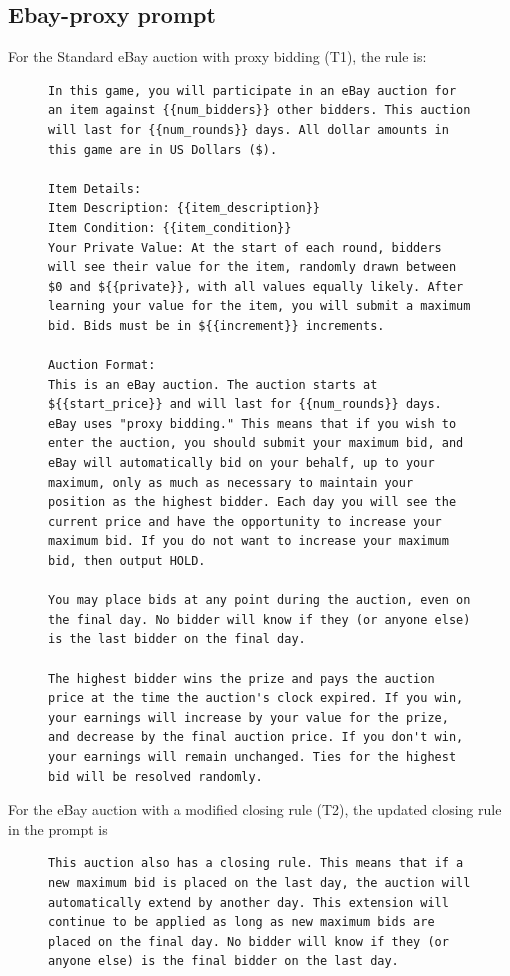 \documentclass{article} %
\begin{document}
\subsection{Ebay-proxy prompt}
For the Standard eBay auction with proxy bidding (T1), the rule is:
\begin{figure}[H]
\centering
\begin{minipage}{0.95\textwidth}
\begin{lstlisting}
In this game, you will participate in an eBay auction for an item against {{num_bidders}} other bidders. This auction will last for {{num_rounds}} days. All dollar amounts in this game are in US Dollars ($).

Item Details:
Item Description: {{item_description}}
Item Condition: {{item_condition}}
Your Private Value: At the start of each round, bidders will see their value for the item, randomly drawn between $0 and ${{private}}, with all values equally likely. After learning your value for the item, you will submit a maximum bid. Bids must be in ${{increment}} increments.

Auction Format:
This is an eBay auction. The auction starts at ${{start_price}} and will last for {{num_rounds}} days. eBay uses "proxy bidding." This means that if you wish to enter the auction, you should submit your maximum bid, and eBay will automatically bid on your behalf, up to your maximum, only as much as necessary to maintain your position as the highest bidder. Each day you will see the current price and have the opportunity to increase your maximum bid. If you do not want to increase your maximum bid, then output HOLD.

You may place bids at any point during the auction, even on the final day. No bidder will know if they (or anyone else) is the last bidder on the final day.

The highest bidder wins the prize and pays the auction price at the time the auction's clock expired. If you win, your earnings will increase by your value for the prize, and decrease by the final auction price. If you don't win, your earnings will remain unchanged. Ties for the highest bid will be resolved randomly.
\end{lstlisting}
\end{minipage}
\label{fig:sealbid_prompt-7}
\end{figure}


For the eBay auction with a modified closing rule (T2), the updated closing rule in the prompt is

\begin{figure}[H]
\centering
\begin{minipage}{0.95\textwidth}
\begin{lstlisting}
This auction also has a closing rule. This means that if a new maximum bid is placed on the last day, the auction will automatically extend by another day. This extension will continue to be applied as long as new maximum bids are placed on the final day. No bidder will know if they (or anyone else) is the final bidder on the last day.
\end{lstlisting}
\end{minipage}
\label{fig:sealbid_prompt-8}
\end{figure}
\end{document}
